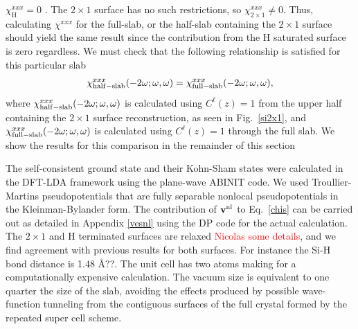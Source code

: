 \documentclass[floatfix,prb,aps,superscriptaddress,11pt,preprint,letterpaper]{revtex4}
\def\chon{red}
\begin{document}
$\chi_{\mathrm{H}}^{xxx}=0${\color{\chon} . The $2\times 1$ surface has no 
such restrictions, so} $\chi_{2\times 1}^{xxx}\ne 0$.
Thus, calculating $\chi^{xxx}$ for the full-slab, or the 
{\color{\chon} half-slab containing} the $2\times 1$ surface\cite{nota1}
{\color{\chon} should yield the} same result since the contribution from the H
saturated surface is zero {\color{\chon} regardless. 
We must check that the following 
relationship is satisfied for this particular slab}
\begin{align}\label{hs}
\chi_{\mathrm{half-slab}}^{xxx}(-2\omega;\omega,\omega) 
=
\chi_{\mathrm{full-slab}}^{xxx}(-2\omega;\omega,\omega)
,
\end{align}
where
$\chi_{\mathrm{half-slab}}^{xxx}(-2\omega;\omega,\omega)$ is calculated using
$C^\ell(z)=1$ {\color{\chon} from the upper half containing the }$2\times 1$ 
surface reconstruction, as seen in Fig.~\ref{si2x1},
and $\chi_{\mathrm{full-slab}}^{xxx}(-2\omega;\omega,\omega)$ is calculated using
$C^\ell(z)=1$ through the full slab.
{\color{\chon} We show the results for this comparison in the remainder 
of this section}

The self-consistent ground state and their Kohn-Sham states were
calculated in the {\color{\chon} DFT-LDA framework using} the plane-wave 
ABINIT code.\cite{abinit}
We used Troullier-Martins pseudopotentials\cite{troullierPRB91} that are 
fully separable nonlocal pseudopotentials in the Kleinman-Bylander 
{\color{\chon} form.\cite{kleinmanPRL82}
The contribution of $\mathbf{v}^{\mathrm{nl}}$ to Eq.~\eqref{chis} can be carried out 
as detailed in Appendix \ref{vesnl} using the DP code for 
the actual calculation}.\cite{francesco}
The $2\times 1$ and {\color{\chon} H terminated} surfaces are relaxed 
\textcolor{red}{Nicolas some details}, 
{\color{\chon} and we} find agreement with previous results for 
both surfaces.\cite{relax} 
{\color{\chon} For instance the Si-H bond distance is 1.48 \AA ??.} 
The unit cell has two atoms {\color{\chon} making for a computationally
expensive calculation.} 
The vacuum size is equivalent to one {\color{\chon} quarter the} 
size of the slab, {\color{\chon} avoiding the effects produced by possible 
wave-function tunneling} from the contiguous surfaces of the full
crystal formed by the repeated super cell scheme.\cite{mendozaPRB06}    
\end{document}
